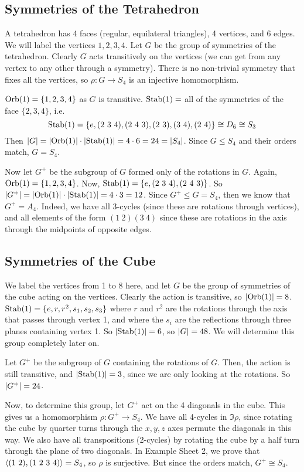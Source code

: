 \subsection{Symmetries of the Tetrahedron}
A tetrahedron has 4 faces (regular, equilateral triangles), 4 vertices, and 6 edges. We will label the vertices $1, 2, 3, 4$. Let $G$ be the group of symmetries of the tetrahedron. Clearly $G$ acts transitively on the vertices (we can get from any vertex to any other through a symmetry). There is no non-trivial symmetry that fixes all the vertices, so $\rho\colon G \to S_4$ is an injective homomorphism.

$\operatorname{Orb}(1) = \{ 1, 2, 3, 4 \}$ as $G$ is transitive. $\operatorname{Stab}(1) =$ all of the symmetries of the face $\{2,3,4\}$, i.e.
\[ \operatorname{Stab}(1) = \{ e, (2\ 3\ 4), (2\ 4\ 3), (2\ 3), (3\ 4), (2\ 4) \} \cong D_6 \cong S_3 \]
Then $\abs{G} = \abs{\operatorname{Orb}(1)} \cdot \abs{\operatorname{Stab}(1)} = 4 \cdot 6 = 24 = \abs{S_4}$. Since $G \leq S_4$ and their orders match, $G = S_4$.

Now let $G^+$ be the subgroup of $G$ formed only of the rotations in $G$. Again, $\operatorname{Orb}(1) = \{ 1, 2, 3, 4 \}$. Now, $\operatorname{Stab}(1) = \{ e, (2\ 3\ 4), (2\ 4\ 3) \}$. So $\abs{G^+} = \abs{\operatorname{Orb}(1)} \cdot \abs{\operatorname{Stab}(1)} = 4 \cdot 3 = 12$. Since $G^+ \leq G = S_4$, then we know that $G^+ = A_4$. Indeed, we have all 3-cycles (since these are rotations through vertices), and all elements of the form $(1\ 2)(3\ 4)$ since these are rotations in the axis through the midpoints of opposite edges.

\subsection{Symmetries of the Cube}
We label the vertices from 1 to 8 here, and let $G$ be the group of symmetries of the cube acting on the vertices. Clearly the action is transitive, so $\abs{\operatorname{Orb}(1)} = 8$. $\operatorname{Stab}(1) = \{ e, r, r^2, s_1, s_2, s_3 \}$ where $r$ and $r^2$ are the rotations through the axis that passes through vertex 1, and where the $s_i$ are the reflections through three planes containing vertex 1. So $\abs{\operatorname{Stab}(1)} = 6$, so $\abs{G} = 48$. We will determine this group completely later on.

Let $G^+$ be the subgroup of $G$ containing the rotations of $G$. Then, the action is still transitive, and $\abs{\operatorname{Stab}(1)} = 3$, since we are only looking at the rotations. So $\abs{G^+} = 24$.

Now, to determine this group, let $G^+$ act on the 4 diagonals in the cube. This gives us a homomorphism $\rho\colon G^+ \to S_4$. We have all 4-cycles in $\Im \rho$, since rotating the cube by quarter turns through the $x, y, z$ axes permute the diagonals in this way. We also have all transpositions (2-cycles) by rotating the cube by a half turn through the plane of two diagonals. In Example Sheet 2, we prove that $\langle (1\ 2), (1\ 2\ 3\ 4) \rangle = S_4$, so $\rho$ is surjective. But since the orders match, $G^+ \cong S_4$.

